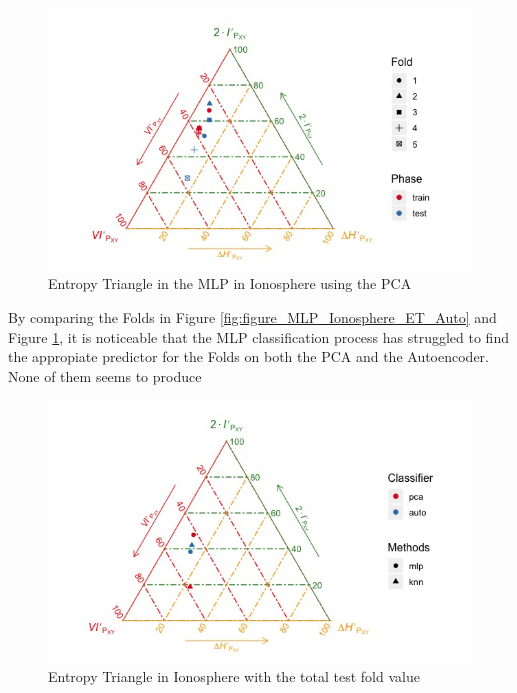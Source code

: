 \begin{figure}[H]
	\centering
	\includegraphics[width=1\linewidth]{Figuras_tfg/ET_mlp_Ionosphere_pca}
	\caption{Entropy Triangle in the MLP in Ionosphere using the PCA}
	\label{fig:figure_MLP_Ionosphere_ET_PCA}
\end{figure}

By comparing the Folds in Figure \ref{fig:figure_MLP_Ionosphere_ET_Auto} and Figure \ref{fig:figure_MLP_Ionosphere_ET_PCA}, it is noticeable that the MLP classification process has struggled to find the appropiate predictor for the Folds on both the PCA and the Autoencoder. None of them seems to produce  



\begin{figure}[H]
	\centering
	\includegraphics[width=1\linewidth]{Figuras_tfg/ET_Total_Ionosphere}
	\caption{Entropy Triangle in Ionosphere with the total test fold value}
	\label{fig:figure_Total_Ionosphere_ET}
\end{figure}


